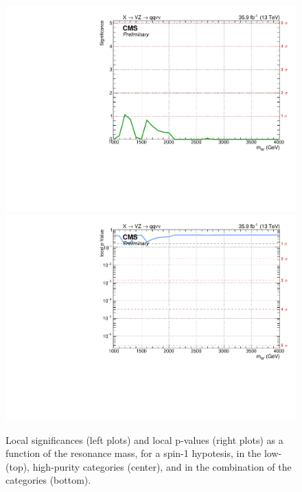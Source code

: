 \begin{figure}[!htb]
\begin{center}
     \includegraphics[width=.495\textwidth]{v9/plotsAlpha/Limits/Significance_XWZInv_XVZnn.pdf}%
     \includegraphics[width=.495\textwidth]{v9/plotsAlpha/Limits/pValue_XWZInv_XVZnn.pdf}
  \end{center}
  \caption{Local significances (left plots) and local p-values (right plots) as a function of the resonance mass, for a spin-1 \Wp hypotesis, in the low- (top), high-purity categories (center), and in the combination of the categories (bottom).}
  \label{fig:Signif_XWZInv}
\end{figure}


